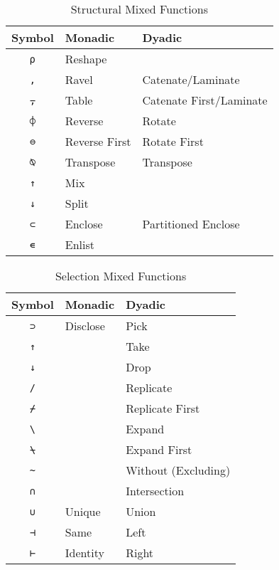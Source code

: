 \documentclass[numbers,preprint]{sigplanconf}
\begin{document}
\begin{table}
\centering
\begin{tabular}{cll}
\toprule
Symbol     & Monadic       & Dyadic \\
\midrule
\texttt{⍴} & Reshape       & \\
\texttt{,} & Ravel         & Catenate/Laminate \\
\texttt{⍪} & Table         & Catenate First/Laminate \\
\texttt{⌽} & Reverse       & Rotate \\
\texttt{⊖} & Reverse First & Rotate First \\
\texttt{⍉} & Transpose     & Transpose \\
\texttt{↑} & Mix           & \\
\texttt{↓} & Split         & \\
\texttt{⊂} & Enclose       & Partitioned Enclose \\
\texttt{∊} & Enlist        & \\
\end{tabular}
\caption{Structural Mixed Functions}
\label{tab:structprims}
\end{table}

\begin{table}
\centering
\begin{tabular}{cll}
\toprule
Symbol                   & Monadic  & Dyadic \\
\midrule
\texttt{⊃}               & Disclose & Pick\\
\texttt{↑}               &          & Take \\
\texttt{↓}               &          & Drop \\
\texttt{/}               &          & Replicate \\
\texttt{⌿}               &          & Replicate First \\
\texttt{\textbackslash}  &          & Expand \\
\texttt{⍀}               &          & Expand First \\
\texttt{\textasciitilde} &          & Without (Excluding) \\
\texttt{∩}               &          & Intersection \\
\texttt{∪}               & Unique   & Union \\
\texttt{⊣}               & Same     & Left \\
\texttt{⊢}               & Identity & Right\\
\end{tabular}
\caption{Selection Mixed Functions}
\label{tab:selprims}
\end{table}
\end{document}
